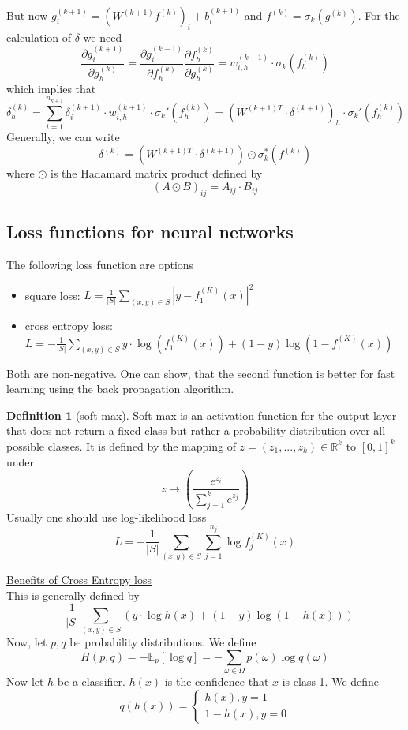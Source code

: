 \documentclass[a4paper, 12pt]{article}
\theoremstyle{plain}
\theoremstyle{definition}
\newtheorem{definition}[theorem]{Definition} %
\theoremstyle{lemma}
\theoremstyle{remark}
\theoremstyle{example}
\begin{document}
	But now $g_i^{(k+1)} = \left(W^{(k+1)}f^{(k)}\right)_i + b_i^{(k+1)}$ and $f^{(k)} = \sigma_k(g^{(k)})$. For the calculation of $\delta$ we need \[\frac{\partial g_i^{(k+1)}}{\partial g_h^{(k)}} = \frac{\partial g_i^{(k+1)}}{\partial f_h^{(k)}} \frac{\partial f_h^{(k)}}{\partial g_h^{(k)}} = w_{i,h}^{(k+1)}\cdot \sigma_k(f_h^{(k)})\] which implies that \[\delta_h^{(k)} = \sum_{i=1}^{n_{k+1}} \delta_i^{(k+1)}\cdot w_{i,h}^{(k+1)}\cdot \sigma_k'(f_h^{(k)}) = \left(W^{(k+1)T}\cdot \delta^{(k+1)}\right)_h\cdot \sigma_k'(f_h^{(k)})\]
	Generally, we can write \[\delta^{(k)} = \left(W^{(k+1)T}\cdot \delta^{(k+1)}\right) \odot \sigma_k^*(f^{(k)})\] where $\odot$ is the Hadamard matrix product defined by \[(A\odot B)_{ij} = A_{ij}\cdot B_{ij}\]
	\subsection{Loss functions for neural networks}
	The following loss function are options \begin{itemize}
		\item square loss: $L = \frac{1}{\left|S\right|} \sum_{(x,y) \in S} \left|y-f_1^{(K)}(x)\right|^2$
		\item cross entropy loss: $L = -\frac{1}{\left|S\right|} \sum_{(x,y) \in S} y\cdot \log(f_1^{(K)}(x)) + (1-y)\log(1-f_1^{(K)}(x))$
	\end{itemize}
	Both are non-negative. One can show, that the second function is better for fast learning using the back propagation algorithm.
	\begin{definition}[soft max]
		Soft max is an activation function for the output layer that does not return a fixed class but rather a probability distribution over all possible classes. It is defined by the mapping of $z = (z_1,...,z_k) \in \mathbb{R}^k$ to $[0,1]^k$ under \[z \mapsto \left(\frac{e^{z_i}}{\sum_{j=1}^k e^{z_j}}\right)\]
		Usually one should use log-likelihood loss \[L = - \frac{1}{\left|S\right|} \sum_{(x,y) \in S} \sum_{j=1}^{n_j} \log f_j^{(K)}(x)\] 
	\end{definition}
	\underline{Benefits of Cross Entropy loss}\\
	This is generally defined by \[-\frac{1}{\left|S\right|} \sum_{(x,y) \in S} (y\cdot \log h(x) + (1-y)\log (1-h(x)))\]
	Now, let $p,q$ be probability distributions. We define \[H(p,q) = -\mathbb{E}_p [\log q] = -\sum_{\omega \in \Omega} p(\omega) \log q(\omega)\]
	Now let $h$ be a classifier. $h(x)$ is the confidence that $x$ is class 1. We define \[q(h(x)) = \begin{cases}
		h(x), y = 1\\
		1-h(x), y = 0
	\end{cases}\]
\end{document}
